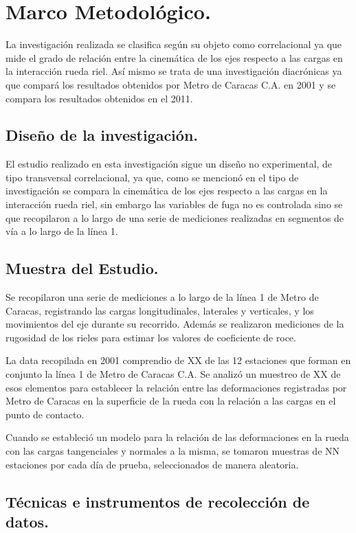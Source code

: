 \documentclass[main]{subfiles}
\begin{document}
\chapter{Marco Metodológico.}

La investigación realizada se clasifica según su objeto como correlacional ya que mide el grado de relación entre la cinemática de los ejes respecto a las cargas en la interacción rueda riel. Así mismo se trata de una investigación diacrónicas ya que compará los resultados obtenidos por Metro de Caracas C.A. en 2001 y se compara los resultados obtenidos en el 2011.

\section{Diseño de la investigación.}
El estudio realizado en esta investigación sigue un diseño no experimental, de tipo transversal correlacional, ya que, como se mencionó en el tipo de investigación se compara la cinemática de los ejes respecto a las cargas en la interacción rueda riel, sin embargo las variables de fuga no es controlada sino se que recopilaron a lo largo de una serie de mediciones realizadas en segmentos de vía a lo largo de la línea 1.

\section{Muestra del Estudio.}

Se recopilaron una serie de mediciones a lo largo de la línea 1 de Metro de Caracas, registrando las cargas longitudinales, laterales y verticales, y los movimientos del eje durante su recorrido.  Además se realizaron mediciones de la rugosidad de los rieles para estimar los valores de coeficiente de roce.

La data recopilada en 2001 comprendio de XX de las 12 estaciones que forman en conjunto la línea 1 de Metro de Caracas C.A. Se analizó un muestreo de XX de esos elementos para establecer la relación entre las deformaciones registradas por Metro de Caracas en la superficie de la rueda con la relación a las cargas en el punto de contacto.

Cuando se estableció un modelo para la relación de las deformaciones en la rueda con las cargas tangenciales y normales a la misma, se tomaron muestras de NN estaciones por cada día de prueba, seleccionados de manera aleatoria.

\section{Técnicas e instrumentos de recolección de datos.}
\end{document}
